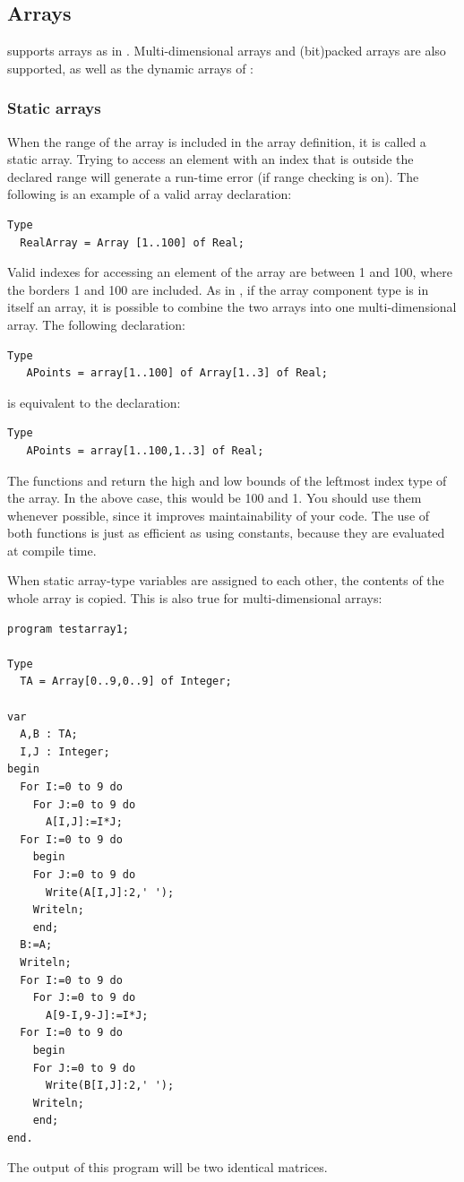 %
\subsection{Arrays}
\fpc supports arrays as in \tp. Multi-dimensional arrays and (bit)packed
arrays are also supported, as well as the dynamic arrays of \delphi:

%
\subsubsection{Static arrays}
 
When the range of the array is included in the array definition, it is
called a static array. Trying to access an element with an index that is
outside the declared range will generate a run-time error (if range checking
is on).  The following is an example of a valid array declaration:
\begin{verbatim}
Type
  RealArray = Array [1..100] of Real;
\end{verbatim}
Valid indexes for accessing an element of the array are between 1 and 100,
where the borders 1 and 100 are included.
As in \tp, if the array component type is in itself an array, it is
possible to combine the two arrays into one multi-dimensional array. The
following declaration:
\begin{verbatim}
Type
   APoints = array[1..100] of Array[1..3] of Real;
\end{verbatim}
is equivalent to the declaration:
\begin{verbatim}
Type
   APoints = array[1..100,1..3] of Real;
\end{verbatim}
The functions  and  return the high and low bounds of
the leftmost index type of the array. In the above case, this would be 100
and 1. You should use them whenever possible, since it improves maintainability
of your code. The use of both functions is just as efficient as using
constants, because they are evaluated at compile time.

When static array-type variables are assigned to each other, the contents of the
whole array is copied. This is also true for multi-dimensional arrays:
\begin{verbatim}
program testarray1;

Type
  TA = Array[0..9,0..9] of Integer;

var
  A,B : TA;
  I,J : Integer;
begin
  For I:=0 to 9 do
    For J:=0 to 9 do
      A[I,J]:=I*J;
  For I:=0 to 9 do
    begin
    For J:=0 to 9 do
      Write(A[I,J]:2,' ');
    Writeln;
    end;
  B:=A;
  Writeln;
  For I:=0 to 9 do
    For J:=0 to 9 do
      A[9-I,9-J]:=I*J;
  For I:=0 to 9 do
    begin
    For J:=0 to 9 do
      Write(B[I,J]:2,' ');
    Writeln;
    end;
end.
\end{verbatim}
The output of this program will be two identical matrices.

